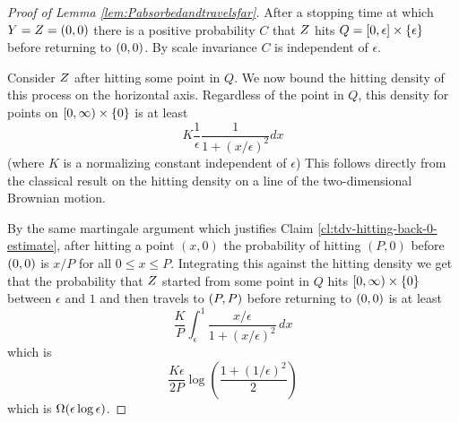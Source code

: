 {\begin{proof}[Proof of Lemma \ref{lem:Pabsorbedandtravelsfar}]
After a stopping time at which $Y = Z = (0,0)$ there is a positive probability $C$
that $Z$ hits $Q=[0, \epsilon] \times
\{\epsilon\}$ before returning to $(0,0)$.
By scale invariance $C$ is independent of $\epsilon$.

\newcommand{\Lp}{[0,\infty) \cross \{0\}}

Consider $Z$ after hitting some point in $Q$.  We now
bound the hitting density of this process on the horizontal
axis.  Regardless of the point in $Q$, this density for points on
$\Lp$ is at least
\[
K\frac{1}{\epsilon} \frac{1}{1 + (x/\epsilon)^2} dx
\]
(where $K$ is a normalizing constant independent of $\epsilon$)
This follows directly from the classical result on the hitting density
on a line of the two-dimensional Brownian motion.

By the same martingale argument which justifies
Claim \ref{cl:tdv-hitting-back-0-estimate}, after hitting a point $(x,0)$ the
probability of hitting $(P,0)$ before $(0,0)$ is $x/P$ for all $0\le x\le P$.
Integrating this against the hitting density we get that the probability that
$Z$ started from some point in $Q$ hits $\Lp$
between $\epsilon$ and $1$ and then travels to $(P,P)$ before returning
to $(0,0)$ is at least
\[
\frac{K}{P} \int_{\epsilon}^{1} \frac{x/\epsilon}{1 + (x/\epsilon)^2}
\, dx
\]
which is
\[
\frac{K\epsilon}{2P} \log\left(\frac{1 + (1/\epsilon)^2}{2}\right)
\]
which is $\Omega(\epsilon\log\epsilon)$.
\end{proof}
}
